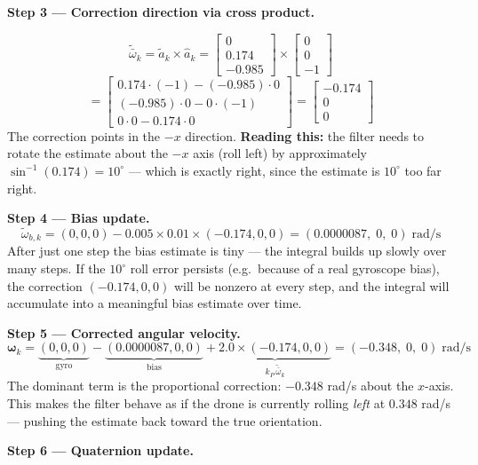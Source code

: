 \documentclass[12pt, a4paper]{article}
\begin{document}
\begin{notebox}
  \textbf{Step 3 --- Correction direction via cross product.}

  \[
    \tilde{\bar{\omega}}_k
    = \tilde{a}_k \times \hat{a}_k
    = \begin{bmatrix}0\\0.174\\-0.985\end{bmatrix}
      \times
      \begin{bmatrix}0\\0\\-1\end{bmatrix}
  \]
  \[
    = \begin{bmatrix}
        0.174\cdot(-1) - (-0.985)\cdot 0 \\
        (-0.985)\cdot 0 - 0\cdot(-1) \\
        0\cdot 0 - 0.174\cdot 0
      \end{bmatrix}
    = \begin{bmatrix}-0.174\\0\\0\end{bmatrix}
  \]
  The correction points in the $-x$ direction.
  \textbf{Reading this:} the filter needs to rotate the estimate about
  the $-x$ axis (roll left) by approximately $\sin^{-1}(0.174) = 10^\circ$
  --- which is exactly right, since the estimate is $10^\circ$ too far
  right.

  \textbf{Step 4 --- Bias update.}
  \[
    \tilde{\omega}_{b,k}
    = (0,0,0) - 0.005\times 0.01\times (-0.174,0,0)
    = (0.0000087,\;0,\;0)\;\text{rad/s}
  \]
  After just one step the bias estimate is tiny --- the integral builds
  up slowly over many steps.
  If the $10^\circ$ roll error persists (e.g.\ because of a real gyroscope
  bias), the correction $(-0.174, 0, 0)$ will be nonzero at every step,
  and the integral will accumulate into a meaningful bias estimate over
  time.

  \textbf{Step 5 --- Corrected angular velocity.}
  \[
    \boldsymbol{\omega}_k
    = \underbrace{(0,0,0)}_{\text{gyro}}
    - \underbrace{(0.0000087,0,0)}_{\text{bias}}
    + \underbrace{2.0\times(-0.174,0,0)}_{k_P\,\tilde{\bar{\omega}}_k}
    = (-0.348,\;0,\;0)\;\text{rad/s}
  \]
  The dominant term is the proportional correction: $-0.348$ rad/s about
  the $x$-axis.
  This makes the filter behave as if the drone is currently rolling
  \emph{left} at $0.348$ rad/s --- pushing the estimate back toward the
  true orientation.

  \textbf{Step 6 --- Quaternion update.}


\end{notebox}
\end{document}
